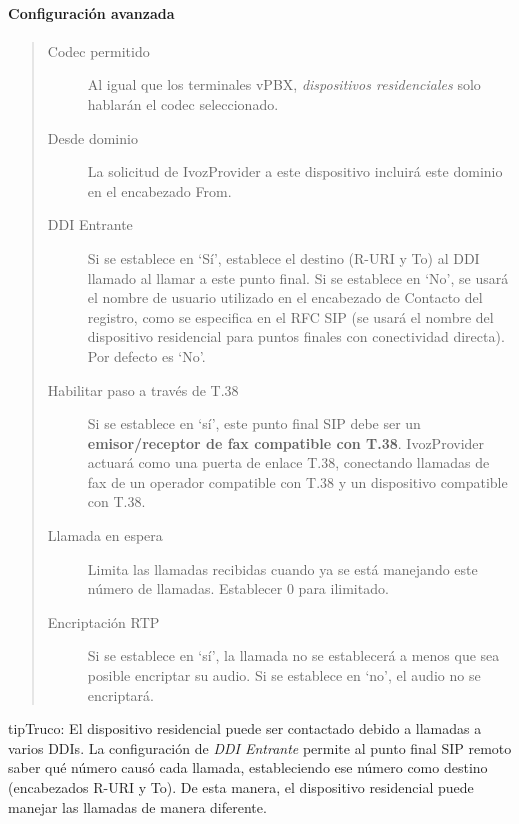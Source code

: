 \documentclass[letterpaper,10pt,spanish]{sphinxmanual}
\begin{document}
\paragraph{Configuración avanzada}
\label{administration_portal/client/residential/residential_devices:advanced-configuration}\begin{quote}
\begin{description}
\item[{Codec permitido}] \leavevmode
Al igual que los terminales vPBX, \emph{dispositivos residenciales} solo hablarán el codec seleccionado.

\item[{Desde dominio}] \leavevmode
La solicitud de IvozProvider a este dispositivo incluirá este dominio en el encabezado From.

\item[{DDI Entrante}] \leavevmode
Si se establece en `Sí', establece el destino (R-URI y To) al DDI llamado al llamar a este punto final. Si se establece en `No', se usará el nombre de usuario utilizado en el encabezado de Contacto del registro, como se especifica en el RFC SIP (se usará el nombre del dispositivo residencial para puntos finales con conectividad directa). Por defecto es `No'.

\item[{Habilitar paso a través de T.38}] \leavevmode
Si se establece en `sí', este punto final SIP debe ser un \textbf{emisor/receptor de fax compatible con T.38}. IvozProvider actuará como una puerta de enlace T.38, conectando llamadas de fax de un operador compatible con T.38 y un dispositivo compatible con T.38.

\item[{Llamada en espera}] \leavevmode
Limita las llamadas recibidas cuando ya se está manejando este número de llamadas. Establecer 0 para ilimitado.

\item[{Encriptación RTP}] \leavevmode
Si se establece en `sí', la llamada no se establecerá a menos que sea posible encriptar su audio. Si se establece en `no', el audio no se encriptará.

\end{description}
\end{quote}

\begin{notice}{tip}{Truco:}
El dispositivo residencial puede ser contactado debido a llamadas a varios DDIs. La configuración de \emph{DDI Entrante} permite al punto final SIP remoto saber qué número causó cada llamada, estableciendo ese número como destino (encabezados R-URI y To). De esta manera, el dispositivo residencial puede manejar las llamadas de manera diferente.
\end{notice}
\end{document}
